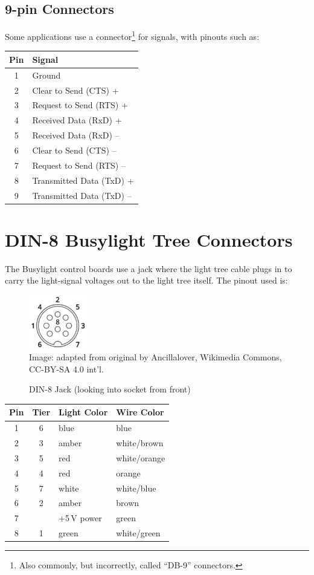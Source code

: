 \subsection{9-pin Connectors}
Some applications use a  connector\footnote{Also commonly, but incorrectly, called ``DB-9'' connectors.} for  signals, with pinouts such as:
\begin{center}
	\begin{tabular}{cl}\toprule
		\bfseries Pin & \bfseries Signal\\\midrule
		1&Ground\\
		2&Clear to Send (CTS) +\\
		3&Request to Send (RTS) +\\
		4&Received Data (RxD) +\\
		5&Received Data (RxD) --\\
		6&Clear to Send (CTS) --\\
		7&Request to Send (RTS) --\\
		8&Transmitted Data (TxD) +\\
		9&Transmitted Data (TxD) --\\
		\bottomrule
	\end{tabular}
\end{center}

\section{DIN-8 Busylight Tree Connectors}
The Busylight control boards use a  jack where the light tree cable plugs in to carry the light-signal
voltages out to the light tree itself. The pinout used is:
\begin{figure}
	\begin{center}
		\includegraphics[width=1in]{images/din8.png}\\
		{\tiny Image: adapted from original by Ancillalover, Wikimedia Commons, CC-BY-SA 4.0 int'l.}
		\caption{DIN-8 Jack (looking into socket from front)\label{fig:din9}}
	\end{center}
\end{figure}
\begin{center}
	\begin{tabular}{ccll}\toprule
		\bfseries Pin & \bfseries Tier & \bfseries Light Color & \bfseries Wire Color\\\midrule
		1&6&blue&blue\\
		2&3&amber&white/brown\\
		3&5&red&white/orange\\
		4&4&red&orange\\
		5&7&white&white/blue\\
		6&2&amber&brown\\
		7&&+5\,V power&green\\
		8&1&green&white/green\\\bottomrule
	\end{tabular}
\end{center}


